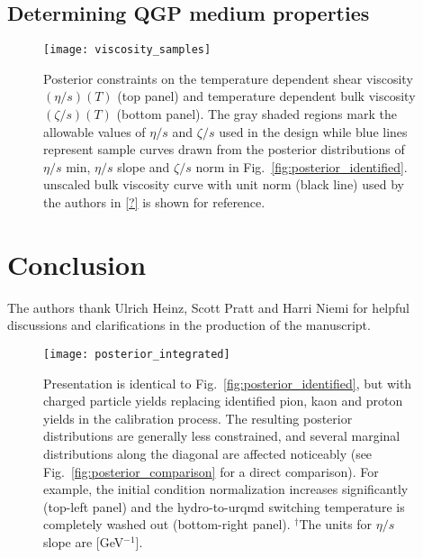 \documentclass[aps,prc,reprint,amsmath]{revtex4-1}
\begin{document}
\subsection{Determining QGP medium properties}
\begin{figure}
    \texttt{[image: viscosity\_samples]}
    \caption{Posterior constraints on the temperature dependent shear viscosity $(\eta/s)(T)$ (top panel) and temperature dependent bulk viscosity $(\zeta/s)(T)$ (bottom panel). The gray shaded regions mark the allowable values of $\eta/s$ and $\zeta/s$ used in the design while blue lines represent sample curves drawn from the posterior distributions of $\eta/s$ min, $\eta/s$ slope and $\zeta/s$ norm in Fig.~\ref{fig:posterior_identified}. unscaled bulk viscosity curve with unit norm (black line) used by the authors in \ref{?} is shown for reference.}
\end{figure}

\section{Conclusion}

\acknowledgements
The authors thank Ulrich Heinz, Scott Pratt and Harri Niemi for helpful discussions and clarifications in the production of the manuscript.
\appendix

\begin{figure*}
    \texttt{[image: posterior\_integrated]}
    \caption{Presentation is identical to Fig.~\ref{fig:posterior_identified}, but with charged particle yields replacing identified pion, kaon and proton yields in the calibration process. The resulting posterior distributions are generally less constrained, and several marginal distributions along the diagonal are affected noticeably (see Fig.~\ref{fig:posterior_comparison} for a direct comparison). For example, the initial condition normalization increases significantly (top-left panel) and the hydro-to-urqmd switching temperature is completely washed out (bottom-right panel). $^\dagger$The units for $\eta/s$ slope are [GeV$^{-1}$]. }
\end{figure*}



\end{document}
